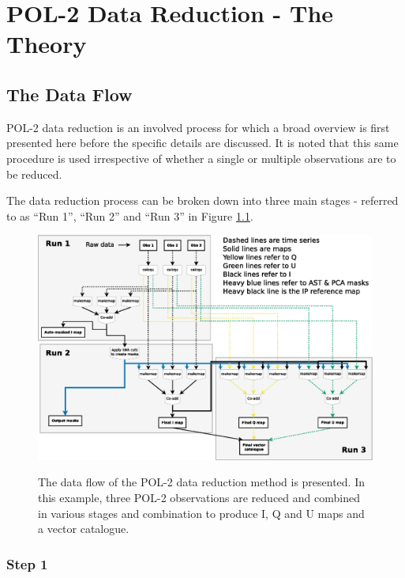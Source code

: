 \chapter{POL-2 Data Reduction - The Theory}
\label{sec:dr}
\section{The Data Flow}

POL-2 data reduction is an involved process for which a broad overview is first presented here before
the specific details are discussed. It is noted that this same procedure is used irrespective of 
whether a single or multiple observations are to be reduced.

The data reduction process can be broken down into three main stages -
referred to as ``Run 1'', ``Run 2'' and ``Run 3'' in Figure \ref{fig:pol2drflow}.

\begin{figure}[t!]
\begin{center}
\includegraphics[width=0.95\linewidth]{pol2map_flow.eps}
\label{fig:pol2drflow}
\caption [POL-2 Data Flow]{
  \small The data flow of the POL-2 data reduction method is
  presented. In this example, three POL-2 observations are
  reduced and combined in various stages and combination to
  produce I, Q and U maps and a vector catalogue.
}
\end{center}
\end{figure}


\subsection*{Step 1}

